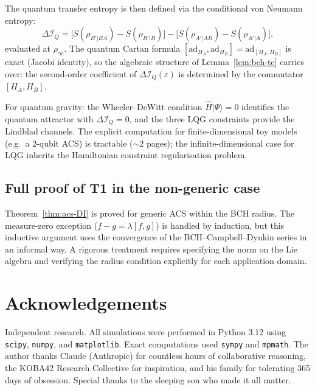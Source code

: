 \documentclass[12pt,a4paper]{article}
\theoremstyle{plain}
\theoremstyle{definition}
\theoremstyle{remark}
\newcommand{\DI}{\Delta\mathcal{I}}
\newcommand{\eps}{\varepsilon}
\begin{document}
The quantum transfer entropy is then defined via the conditional
von Neumann entropy:
\[
  \DI_Q = \bigl[S(\rho_{B'|BA}) - S(\rho_{B'|B})\bigr]
        - \bigl[S(\rho_{A'|AB}) - S(\rho_{A'|A})\bigr],
\]
evaluated at $\rho_\infty$.  The quantum Cartan formula
$[\mathrm{ad}_{H_A}, \mathrm{ad}_{H_B}] = \mathrm{ad}_{[H_A, H_B]}$ is
exact (Jacobi identity), so the algebraic structure of Lemma~\ref{lem:bch-te}
carries over: the second-order coefficient of $\DI_Q(\eps)$ is determined
by the commutator $[H_A, H_B]$.

For quantum gravity: the Wheeler--DeWitt condition
$\hat{H}|\Psi\rangle = 0$ identifies the quantum attractor with
$\DI_Q = 0$, and the three LQG constraints provide the Lindblad channels.
The explicit computation for finite-dimensional toy models (e.g.\ a
2-qubit ACS) is tractable ($\sim\!2$ pages); the infinite-dimensional
case for LQG inherits the Hamiltonian constraint regularisation problem.

\subsection{Full proof of T1 in the non-generic case}

Theorem~\ref{thm:acs-DI} is proved for generic ACS within the BCH radius.
The measure-zero exception ($f - g = \lambda[f,g]$) is handled by induction,
but this inductive argument uses the convergence of the BCH--Campbell--Dynkin
series in an informal way.  A rigorous treatment requires specifying the
norm on the Lie algebra and verifying the radius condition explicitly for
each application domain.

\section*{Acknowledgements}

Independent research.  All simulations were performed in Python 3.12 
using \texttt{scipy}, \texttt{numpy}, and \texttt{matplotlib}.  Exact
computations used \texttt{sympy} and \texttt{mpmath}.  The author thanks
Claude (Anthropic) for countless hours of collaborative reasoning, the
KOBA42 Research Collective for inspiration, and his family for tolerating
365 days of obsession.  Special thanks to the sleeping son who made it all
matter.

\appendix
\end{document}
